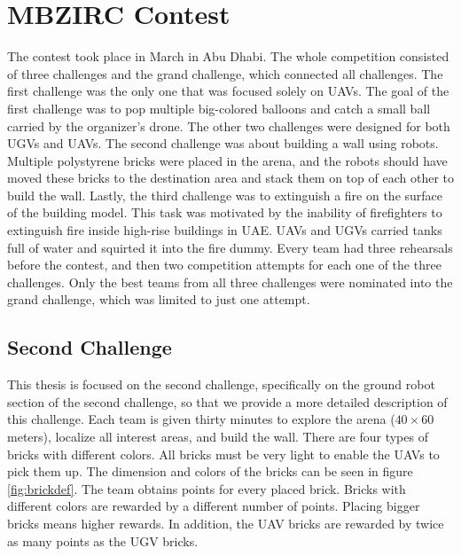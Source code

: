 \section{MBZIRC Contest}
The contest took place in March in Abu Dhabi. The whole competition consisted of three challenges and the grand challenge, which connected all challenges. The first challenge was the only one that was focused solely on UAVs. The goal of the first challenge was to pop multiple big-colored balloons and catch a small ball carried by the organizer's drone. The other two challenges were designed for both UGVs and UAVs. The second challenge was about building a wall using robots. Multiple polystyrene bricks were placed in the arena, and the robots should have moved these bricks to the destination area and stack them on top of each other to build the wall. Lastly, the third challenge was to extinguish a fire on the surface of the building model. This task was motivated by the inability of firefighters to extinguish fire inside high-rise buildings in UAE. UAVs and UGVs carried tanks full of water and squirted it into the fire dummy. Every team had three rehearsals before the contest, and then two competition attempts for each one of the three challenges. Only the best teams from all three challenges were nominated into the grand challenge, which was limited to just one attempt.

\subsection{Second Challenge}
This thesis is focused on the second challenge, specifically on the ground robot section of the second challenge, so that we provide a more detailed description of this challenge. Each team is given thirty minutes to explore the arena ($40 \times 60$ meters), localize all interest areas, and build the wall. There are four types of bricks with different colors. All bricks must be very light to enable the UAVs to pick them up. The dimension and colors of the bricks can be seen in figure \ref{fig:brickdef}. The team obtains points for every placed brick. Bricks with different colors are rewarded by a different number of points. Placing bigger bricks means higher rewards. In addition, the UAV bricks are rewarded by twice as many points as the UGV bricks.


